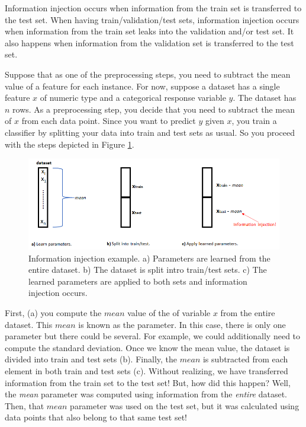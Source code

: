 \documentclass[
  11pt,
]{krantz}
\makeatletter
\newenvironment{kframe}{%
\medskip{}
\setlength{\fboxsep}{.8em}
 \def\at@end@of@kframe{}%
 \ifinner\ifhmode%
  \def\at@end@of@kframe{\end{minipage}}%
  \begin{minipage}{\columnwidth}%
 \fi\fi%
 \def\FrameCommand##1{\hskip\@totalleftmargin \hskip-\fboxsep
 \colorbox{shadecolor}{##1}\hskip-\fboxsep
     \hskip-\linewidth \hskip-\@totalleftmargin \hskip\columnwidth}%
 \MakeFramed {\advance\hsize-\width
   \@totalleftmargin\z@ \linewidth\hsize
   \@setminipage}}%
 {\par\unskip\endMakeFramed%
 \at@end@of@kframe}
\newenvironment{rmdblock}[1]
  {
  \begin{itemize}
  \renewcommand{\labelitemi}{
    \raisebox{-.7\height}[0pt][0pt]{
      {\setkeys{Gin}{width=3em,keepaspectratio}\texttt{[image: images/icons/\#1]}}
    }
  }
  \setlength{\fboxsep}{1em}
  \begin{kframe}
  \item
  }
  {
  \end{kframe}
  \end{itemize}
  }
\newenvironment{rmdinfo}
  {\begin{rmdblock}{info}}
  {\end{rmdblock}}
\makeatother
\begin{document}
\begin{rmdinfo}
Information injection occurs when information from the train set is transferred to the test set. When having train/validation/test sets, information injection occurs when information from the train set leaks into the validation and/or test set. It also happens when information from the validation set is transferred to the test set.
\end{rmdinfo}
Suppose that as one of the preprocessing steps, you need to subtract the mean value of a feature for each instance. For now, suppose a dataset has a single feature \(x\) of numeric type and a categorical response variable \(y\). The dataset has \(n\) rows. As a preprocessing step, you decide that you need to subtract the mean of \(x\) from each data point. Since you want to predict \(y\) given \(x\), you train a classifier by splitting your data into train and test sets as usual. So you proceed with the steps depicted in Figure \ref{fig:injection1}.

\begin{figure}

{\centering \includegraphics[width=0.9\linewidth]{images/info_injection_1} 

}

\caption{Information injection example. a) Parameters are learned from the entire dataset. b) The dataset is split intro train/test sets. c) The learned parameters are applied to both sets and information injection occurs.}\label{fig:injection1}
\end{figure}

First, (a) you compute the \(mean\) value of the of variable \(x\) from the entire dataset. This \(mean\) is known as the parameter. In this case, there is only one parameter but there could be several. For example, we could additionally need to compute the standard deviation. Once we know the mean value, the dataset is divided into train and test sets (b). Finally, the \(mean\) is subtracted from each element in both train and test sets (c). Without realizing, we have transferred information from the train set to the test set! But, how did this happen? Well, the \emph{mean} parameter was computed using information from the \emph{entire} dataset. Then, that \(mean\) parameter was used on the test set, but it was calculated using data points that also belong to that same test set!
\end{document}
